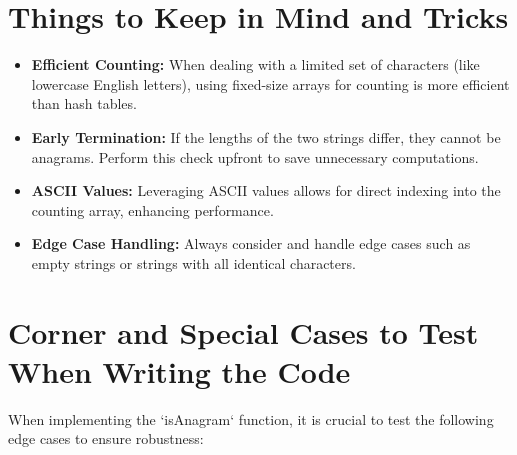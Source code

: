 \section*{Things to Keep in Mind and Tricks}
\begin{itemize}
    \item \textbf{Efficient Counting:} When dealing with a limited set of characters (like lowercase English letters), using fixed-size arrays for counting is more efficient than hash tables.
    
    \item \textbf{Early Termination:} If the lengths of the two strings differ, they cannot be anagrams. Perform this check upfront to save unnecessary computations.
    
    \item \textbf{ASCII Values:} Leveraging ASCII values allows for direct indexing into the counting array, enhancing performance.
    
    \item \textbf{Edge Case Handling:} Always consider and handle edge cases such as empty strings or strings with all identical characters.
\end{itemize}

\section*{Corner and Special Cases to Test When Writing the Code}
When implementing the `isAnagram` function, it is crucial to test the following edge cases to ensure robustness:

